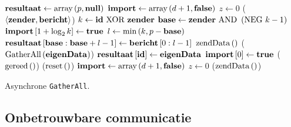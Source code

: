 \begin{algorithm}[hbt]
 $\rslt\leftarrow\funm{array}{p,\nult}$\;
 $\impt\leftarrow\funm{array}{d+1,\fals}$\;
 $z\leftarrow0$\;
 \WhnRcv($\tupl{\sndr,\msgt}$){
   $k\leftarrow\idet\mbox{ XOR }\sndr$\;
   $\bset\leftarrow\sndr\mbox{ AND }\brak{\mbox{NEG } k-1}$\;
   $\impt\fbrk{1+\log_2k}\leftarrow\true$\;
   $l\leftarrow\funm{min}{k,p-\bset}$\;
   $\rslt\fbrk{\bset:\bset+l-1}\leftarrow\msgt\fbrk{0:l-1}$\;
   $\funm{zendData}{}$\;
 }
 \Func($\funm{GatherAll}{\owdt}$){
   $\rslt\fbrk{\idet}\leftarrow\owdt$\;
   $\impt\fbrk{0}\leftarrow\true$\;
 }
 \Func($\funm{gereed}{}$){
   \;
 }
 \Func($\funm{reset}{}$){
   $\impt\leftarrow\funm{array}{d+1,\fals}$\;
   $z\leftarrow 0$\;
 }{}
 \Func($\funm{zendData}{}$){
 }{}
 \caption{Asynchrone \texttt{GatherAll}.}
\end{algorithm}


\subsection{Onbetrouwbare communicatie}



